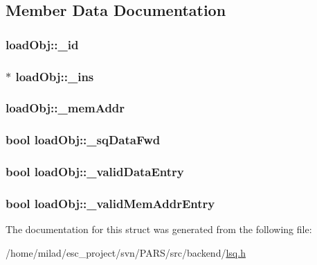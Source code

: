 \subsection{Member Data Documentation}
\hypertarget{structloadObj_a97df4b71c67011b6ee95425d2064f611}{
\subsubsection[{\_\-id}]{ {\bf loadObj::\_\-id}}}
\label{structloadObj_a97df4b71c67011b6ee95425d2064f611}
\hypertarget{structloadObj_ae32e4dcdfc8c2579dd13f4eaec948f4e}{
\subsubsection[{\_\-ins}]{$\ast$ {\bf loadObj::\_\-ins}}}
\label{structloadObj_ae32e4dcdfc8c2579dd13f4eaec948f4e}
\hypertarget{structloadObj_a3e67fd0b457d87133712c8e394751a0e}{
\subsubsection[{\_\-memAddr}]{ {\bf loadObj::\_\-memAddr}}}
\label{structloadObj_a3e67fd0b457d87133712c8e394751a0e}
\hypertarget{structloadObj_a013f319b3bb0148e9bd00d6742d54246}{
\subsubsection[{\_\-sqDataFwd}]{\setlength{\rightskip}{0pt plus 5cm}bool {\bf loadObj::\_\-sqDataFwd}}}
\label{structloadObj_a013f319b3bb0148e9bd00d6742d54246}
\hypertarget{structloadObj_acd2c9ebea408592d102df591d4f9b595}{
\subsubsection[{\_\-validDataEntry}]{\setlength{\rightskip}{0pt plus 5cm}bool {\bf loadObj::\_\-validDataEntry}}}
\label{structloadObj_acd2c9ebea408592d102df591d4f9b595}
\hypertarget{structloadObj_aaf2d7a6675caaceff6e594f0686ccb82}{
\subsubsection[{\_\-validMemAddrEntry}]{\setlength{\rightskip}{0pt plus 5cm}bool {\bf loadObj::\_\-validMemAddrEntry}}}
\label{structloadObj_aaf2d7a6675caaceff6e594f0686ccb82}


The documentation for this struct was generated from the following file:\begin{DoxyCompactItemize}
\item 
/home/milad/esc\_\-project/svn/PARS/src/backend/\hyperlink{lsq_8h}{lsq.h}\end{DoxyCompactItemize}
